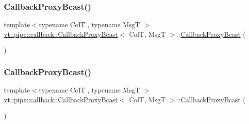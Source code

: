 \mbox{\label{structvt_1_1pipe_1_1callback_1_1_callback_proxy_bcast_a196de6268c374af67345657d9cb2a8d4}} 
\subsubsection{\texorpdfstring{Callback\+Proxy\+Bcast()}{CallbackProxyBcast()}\hspace{0.1cm}{\footnotesize\ttfamily [2/4]}}
{\footnotesize\ttfamily template$<$typename ColT , typename MsgT $>$ \\
\hyperlink{structvt_1_1pipe_1_1callback_1_1_callback_proxy_bcast}{vt\+::pipe\+::callback\+::\+Callback\+Proxy\+Bcast}$<$ ColT, MsgT $>$\+::\hyperlink{structvt_1_1pipe_1_1callback_1_1_callback_proxy_bcast}{Callback\+Proxy\+Bcast} (\begin{DoxyParamCaption}\item[{\hyperlink{structvt_1_1pipe_1_1callback_1_1_callback_proxy_bcast}{Callback\+Proxy\+Bcast}$<$ ColT, MsgT $>$ const \&}]{ }\end{DoxyParamCaption})\hspace{0.3cm}{\ttfamily [default]}}

\mbox{\label{structvt_1_1pipe_1_1callback_1_1_callback_proxy_bcast_adbcbe9ba02478e813d43b53b26ffedd0}} 
\subsubsection{\texorpdfstring{Callback\+Proxy\+Bcast()}{CallbackProxyBcast()}\hspace{0.1cm}{\footnotesize\ttfamily [3/4]}}
{\footnotesize\ttfamily template$<$typename ColT , typename MsgT $>$ \\
\hyperlink{structvt_1_1pipe_1_1callback_1_1_callback_proxy_bcast}{vt\+::pipe\+::callback\+::\+Callback\+Proxy\+Bcast}$<$ ColT, MsgT $>$\+::\hyperlink{structvt_1_1pipe_1_1callback_1_1_callback_proxy_bcast}{Callback\+Proxy\+Bcast} (\begin{DoxyParamCaption}\item[{\hyperlink{structvt_1_1pipe_1_1callback_1_1_callback_proxy_bcast}{Callback\+Proxy\+Bcast}$<$ ColT, MsgT $>$ \&\&}]{ }\end{DoxyParamCaption})\hspace{0.3cm}{\ttfamily [default]}}

